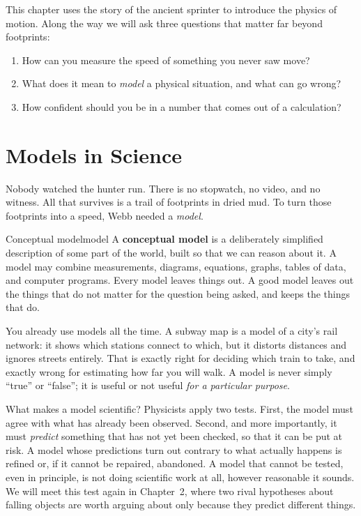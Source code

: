 \documentclass[11pt,twoside,openany]{book}
\newcounter{check}[chapter]
\begin{document}
This chapter uses the story of the ancient sprinter to introduce the physics of motion. Along the way we will ask three questions that matter far beyond footprints:
\begin{enumerate}
  \item How can you measure the speed of something you never saw move?
  \item What does it mean to \emph{model} a physical situation, and what can go wrong?
  \item How confident should you be in a number that comes out of a calculation?
\end{enumerate}

\section{Models in Science}

Nobody watched the hunter run. There is no stopwatch, no video, and no witness. All that survives is a trail of footprints in dried mud. To turn those footprints into a speed, Webb needed a \emph{model}.

\begin{definition}{Conceptual model}{model}
A \textbf{conceptual model} is a deliberately simplified description of some part of the world, built so that we can reason about it. A model may combine measurements, diagrams, equations, graphs, tables of data, and computer programs. Every model leaves things out. A good model leaves out the things that do not matter for the question being asked, and keeps the things that do.
\end{definition}

You already use models all the time. A subway map is a model of a city's rail network: it shows which stations connect to which, but it distorts distances and ignores streets entirely. That is exactly right for deciding which train to take, and exactly wrong for estimating how far you will walk. A model is never simply ``true'' or ``false''; it is useful or not useful \emph{for a particular purpose}.

What makes a model scientific? Physicists apply two tests. First, the model must agree with what has already been observed. Second, and more importantly, it must \emph{predict} something that has not yet been checked, so that it can be put at risk. A model whose predictions turn out contrary to what actually happens is refined or, if it cannot be repaired, abandoned. A model that cannot be tested, even in principle, is not doing scientific work at all, however reasonable it sounds. We will meet this test again in Chapter~2, where two rival hypotheses about falling objects are worth arguing about only because they predict different things.
\end{document}
